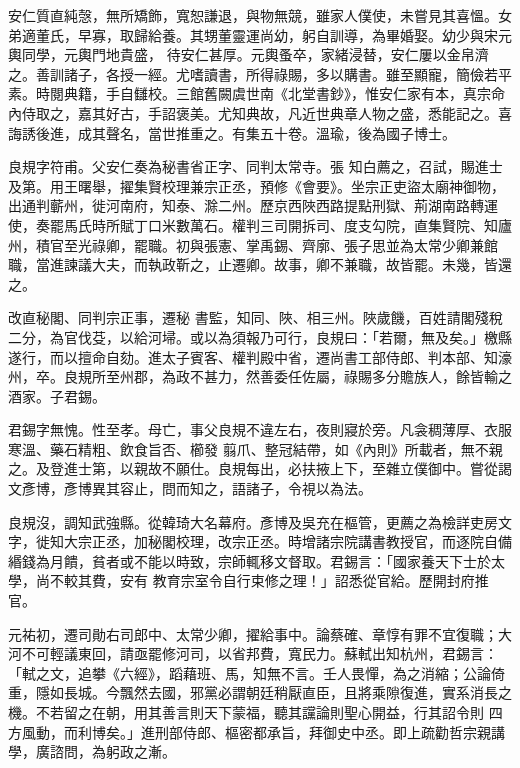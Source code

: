 \begin{pinyinscope}
 安仁質直純愨，無所矯飾，寬恕謙退，與物無競，雖家人僕使，未嘗見其喜慍。女弟適董氏，早寡，取歸給養。其甥董靈運尚幼，躬自訓導，為畢婚娶。幼少與宋元輿同學，元輿門地貴盛，
 待安仁甚厚。元輿蚤卒，家緒浸替，安仁屢以金帛濟之。善訓諸子，各授一經。尤嗜讀書，所得祿賜，多以購書。雖至顯寵，簡儉若平素。時閱典籍，手自讎校。三館舊闕虞世南《北堂書鈔》，惟安仁家有本，真宗命內侍取之，嘉其好古，手詔褒美。尤知典故，凡近世典章人物之盛，悉能記之。喜誨誘後進，成其聲名，當世推重之。有集五十卷。溫瑜，後為國子博士。



 良規字符甫。父安仁奏為秘書省正字、同判太常寺。張
 知白薦之，召試，賜進士及第。用王曙舉，擢集賢校理兼宗正丞，預修《會要》。坐宗正吏盜太廟神御物，出通判蘄州，徙河南府，知泰、滁二州。歷京西陜西路提點刑獄、荊湖南路轉運使，奏罷馬氏時所賦丁口米數萬石。權判三司開拆司、度支勾院，直集賢院、知廬州，積官至光祿卿，罷職。初與張憲、掌禹錫、齊廓、張子思並為太常少卿兼館職，當進諫議大夫，而執政靳之，止遷卿。故事，卿不兼職，故皆罷。未幾，皆還之。



 改直秘閣、同判宗正事，遷秘
 書監，知同、陜、相三州。陜歲饑，百姓請閣殘稅二分，為官伐芟，以給河埽。或以為須報乃可行，良規曰：「若爾，無及矣。」檄縣遂行，而以擅命自劾。進太子賓客、權判殿中省，遷尚書工部侍郎、判本部、知濠州，卒。良規所至州郡，為政不甚力，然善委任佐屬，祿賜多分贍族人，餘皆輸之酒家。子君錫。



 君錫字無愧。性至孝。母亡，事父良規不違左右，夜則寢於旁。凡衾稠薄厚、衣服寒溫、藥石精粗、飲食旨否、櫛發
 翦爪、整冠結帶，如《內則》所載者，無不親之。及登進士第，以親故不願仕。良規每出，必扶掖上下，至雜立僕御中。嘗從謁文彥博，彥博異其容止，問而知之，語諸子，令視以為法。



 良規沒，調知武強縣。從韓琦大名幕府。彥博及吳充在樞管，更薦之為檢詳吏房文字，徙知大宗正丞，加秘閣校理，改宗正丞。時增諸宗院講書教授官，而逐院自備緡錢為月饋，貧者或不能以時致，宗師輒移文督取。君錫言：「國家養天下士於太學，尚不較其費，安有
 教育宗室令自行束修之理！」詔悉從官給。歷開封府推官。



 元祐初，遷司勛右司郎中、太常少卿，擢給事中。論蔡確、章惇有罪不宜復職；大河不可輕議東回，請亟罷修河司，以省邦費，寬民力。蘇軾出知杭州，君錫言：「軾之文，追攀《六經》，蹈藉班、馬，知無不言。壬人畏憚，為之消縮；公論倚重，隱如長城。今飄然去國，邪黨必謂朝廷稍厭直臣，且將乘隙復進，實系消長之機。不若留之在朝，用其善言則天下蒙福，聽其讜論則聖心開益，行其詔令則
 四方風動，而利博矣。」進刑部侍郎、樞密都承旨，拜御史中丞。即上疏勸哲宗親講學，廣諮問，為躬政之漸。




\end{pinyinscope}
